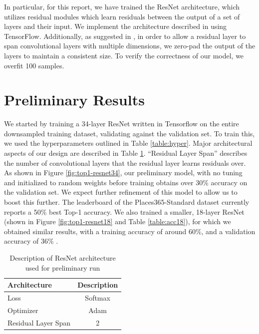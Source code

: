 \documentclass[10pt,twocolumn,letterpaper]{article}
\begin{document}
In particular, for this report, we have trained the ResNet architecture, which
utilizes residual modules which learn residuals between the output of a set of
layers and their input. We implement the architecture described in
\cite{ResNet} using TensorFlow.  Additionally, as suggested in \cite{ResNet},
in order to allow a residual layer to span convolutional layers with multiple
dimensions, we zero-pad the output of the layers to maintain a consistent size.
To verify the correctness of our model, we overfit 100 samples.\\

\section{Preliminary Results}

We started by training a 34-layer ResNet written in Tensorflow on the entire
downsampled training dataset, validating against the validation set. To train
this, we used the hyperparameters outlined in Table \ref{table:hyper}. Major
architectural aspects of our design are described in Table \ref{table:arch}.
``Residual Layer Span'' describes the number of convolutional layers that the
residual layer learns residuals over. \\

As shown in Figure \ref{fig:top1-resnet34}, our preliminary model, with no
tuning and initialized to random weights before training obtains over 30\%
accuracy on the validation set. We expect further refinement of this model to
allow us to boost this further. The leaderboard of the Places365-Standard dataset
currently reports a 50\% best Top-1 accuracy. We also trained a smaller,
18-layer ResNet (shown in Figure \ref{fig:top1-resnet18} and Table \ref{table:acc18}), for
which we obtained similar results, with
a training accuracy of around 60\%, and a validation accuracy of 36\% .\\

\begin{table}
\begin{center}
\begin{tabular}{|l|c|}
\hline
Architecture & Description \\
\hline\hline
Loss & Softmax\\
Optimizer & Adam\\
Residual Layer Span & 2 \\
\hline
\end{tabular}
\end{center}
\caption{Description of ResNet architecture used for preliminary run}
\label{table:arch}
\end{table}
\end{document}
